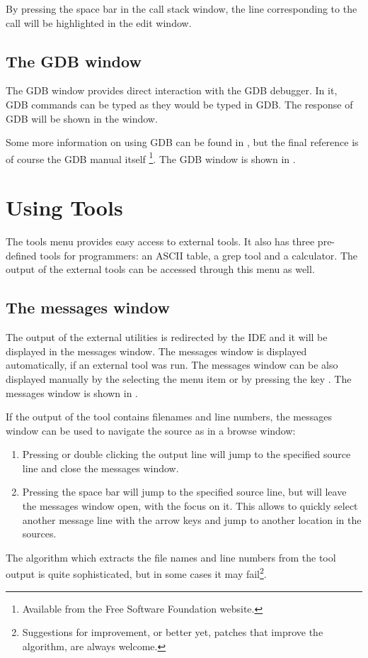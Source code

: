 By pressing the space bar in the call stack window, the line corresponding
to the call will be highlighted in the edit window.

\subsection{The GDB window}
\label{se:gdbwindow}
The GDB window provides direct interaction with the GDB debugger.
In it, GDB commands can be typed as they would be typed in GDB.
The response of GDB will be shown in the window.

Some more information on using GDB can be found in , but
the final reference is of course the GDB manual itself
\footnote{Available from the Free Software Foundation website.}.
The GDB window is shown in .


\section{Using Tools}
\label{se:toolsmenu}
The tools menu provides easy access to external tools. It also has
three pre-defined tools for programmers: an ASCII table,  a grep tool
and a calculator. The output of the external tools can be accessed through
this menu as well.

%
%
\subsection{The messages window}
\label{se:toolsmessages}
The output of the external utilities is redirected by the IDE and it
will be displayed in the messages window. The messages window is
displayed automatically, if an external tool was run. The
messages window can be also displayed manually by the selecting the
menu item  or by pressing the key .
The messages window is shown in .


If the output of the tool contains filenames and line numbers,
the messages window can be used to navigate the source as in a browse
window:
\begin{enumerate}
\item Pressing  or double clicking the output line will jump
to the specified source line and close the messages window.
\item Pressing the space bar will jump to the specified source line, but
will leave the messages window open, with the focus on it. This allows to
quickly select another message line with the arrow keys and jump to 
another location in the sources.
\end{enumerate}
The algorithm which extracts the file names and line numbers from
the tool output is quite sophisticated, but in some cases it may
fail\footnote{Suggestions for improvement, or better yet, patches
that improve the algorithm, are always welcome.}.
%
%
